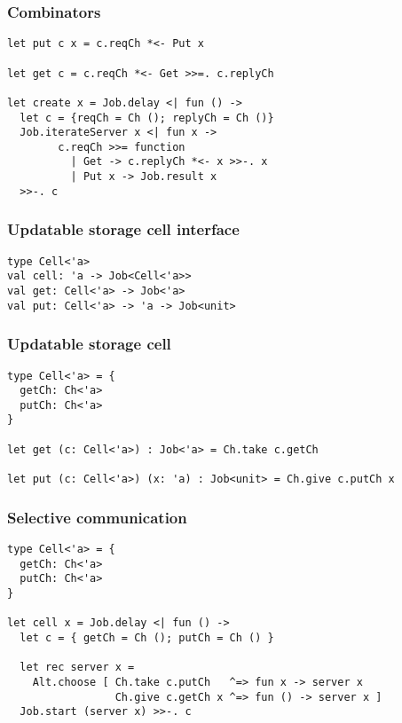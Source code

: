 \documentclass{beamer}
\begin{document}
    \begin{frame}[fragile]
        \frametitle{Combinators}
        \begin{verbatim}
let put c x = c.reqCh *<- Put x

let get c = c.reqCh *<- Get >>=. c.replyCh

let create x = Job.delay <| fun () ->
  let c = {reqCh = Ch (); replyCh = Ch ()}
  Job.iterateServer x <| fun x ->
        c.reqCh >>= function
          | Get -> c.replyCh *<- x >>-. x
          | Put x -> Job.result x
  >>-. c
        \end{verbatim}
    \end{frame}

    \begin{frame}[fragile]
        \frametitle{Updatable storage cell interface}
        \begin{verbatim}
type Cell<'a>
val cell: 'a -> Job<Cell<'a>>
val get: Cell<'a> -> Job<'a>
val put: Cell<'a> -> 'a -> Job<unit>
        \end{verbatim}
    \end{frame}

    \begin{frame}[fragile]
        \frametitle{Updatable storage cell}
        \begin{verbatim}
type Cell<'a> = {
  getCh: Ch<'a>
  putCh: Ch<'a>
}

let get (c: Cell<'a>) : Job<'a> = Ch.take c.getCh

let put (c: Cell<'a>) (x: 'a) : Job<unit> = Ch.give c.putCh x
        \end{verbatim}
    \end{frame}


    \begin{frame}[fragile]
        \frametitle{Selective communication}
        \begin{verbatim}
type Cell<'a> = {
  getCh: Ch<'a>
  putCh: Ch<'a>
}
        
let cell x = Job.delay <| fun () ->
  let c = { getCh = Ch (); putCh = Ch () }
  
  let rec server x =
    Alt.choose [ Ch.take c.putCh   ^=> fun x -> server x
                 Ch.give c.getCh x ^=> fun () -> server x ]
  Job.start (server x) >>-. c
        \end{verbatim}
    \end{frame}
\end{document}
